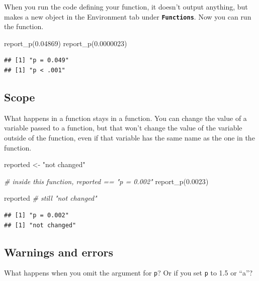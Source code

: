 \documentclass[
  oneside]{book}
\newenvironment{Shaded}{\begin{snugshade}}{\end{snugshade}}
\newcommand{\CommentTok}[1]{\textcolor[rgb]{0.56,0.35,0.01}{\textit{#1}}}
\newcommand{\FloatTok}[1]{\textcolor[rgb]{0.00,0.00,0.81}{#1}}
\newcommand{\FunctionTok}[1]{\textcolor[rgb]{0.00,0.00,0.00}{#1}}
\newcommand{\NormalTok}[1]{#1}
\newcommand{\OtherTok}[1]{\textcolor[rgb]{0.56,0.35,0.01}{#1}}
\newcommand{\StringTok}[1]{\textcolor[rgb]{0.31,0.60,0.02}{#1}}
\begin{document}
When you run the code defining your function, it doesn't output anything, but makes a new object in the Environment tab under \textbf{\texttt{Functions}}. Now you can run the function.

\begin{Shaded}
\begin{Highlighting}[]
\FunctionTok{report\_p}\NormalTok{(}\FloatTok{0.04869}\NormalTok{)}
\FunctionTok{report\_p}\NormalTok{(}\FloatTok{0.0000023}\NormalTok{)}
\end{Highlighting}
\end{Shaded}

\begin{verbatim}
## [1] "p = 0.049"
## [1] "p < .001"
\end{verbatim}

\hypertarget{scope}{%
\subsection{Scope}\label{scope}}

What happens in a function stays in a function. You can change the value of a variable passed to a function, but that won't change the value of the variable outside of the function, even if that variable has the same name as the one in the function.

\begin{Shaded}
\begin{Highlighting}[]
\NormalTok{reported }\OtherTok{\textless{}{-}} \StringTok{"not changed"}

\CommentTok{\# inside this function, reported == "p = 0.002"}
\FunctionTok{report\_p}\NormalTok{(}\FloatTok{0.0023}\NormalTok{) }

\NormalTok{reported }\CommentTok{\# still "not changed"}
\end{Highlighting}
\end{Shaded}

\begin{verbatim}
## [1] "p = 0.002"
## [1] "not changed"
\end{verbatim}

\hypertarget{warnings-errors}{%
\subsection{Warnings and errors}\label{warnings-errors}}

\begin{try}

What happens when you omit the argument for \texttt{p}? Or if you set \texttt{p} to 1.5 or ``a''?

\end{try}
\end{document}
